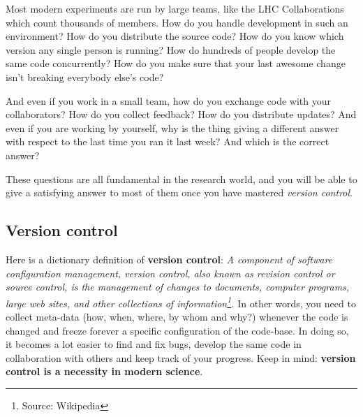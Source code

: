 Most modern experiments are run by large teams, like the LHC Collaborations which count thousands of members. How do you handle development in such an environment? How do you distribute the source code? How do you know which version any single person is running? How do hundreds of people develop the same code concurrently? How do you make sure that your last awesome change isn't breaking everybody else's code?

And even if you work in a small team, how do you exchange code with your collaborators? How do you collect feedback? How do you distribute updates? And even if you are working by yourself, why is the thing giving a different answer with respect to the last time you ran it last week? And which is the correct answer?

These questions are all fundamental in the research world, and you will be able to give a satisfying answer to most of them once you have mastered \textit{version control}. 

\subsection{Version control}

Here is a dictionary definition of \textbf{version control}: \emph{A component of software configuration management, version control, also known as revision control or source control, is the management of changes to documents, computer programs, large web sites, and other collections of information\footnote{Source: Wikipedia}.} In other words, you need to collect meta-data (how, when, where, by whom and why?) whenever the code is changed and freeze forever a specific configuration of the code-base. In doing so, it becomes a lot easier to find and fix bugs, develop the same code in collaboration with others and keep track of your progress. Keep in mind: \textbf{version control is a necessity in modern science}. 


